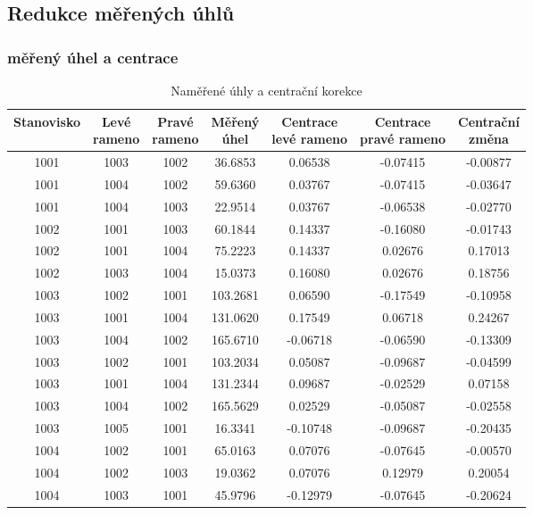 \subsection{Redukce měřených úhlů}
\subsubsection{měřený úhel a centrace}
\begin{table}[H]
    \centering
    \caption{Naměřené úhly a centrační korekce}
    \begin{tabular}{|c|c|c||c|c|c|c|}
        \hline
        Stanovisko & \makecell{Levé\\rameno} & \makecell{Pravé\\rameno} & \makecell{Měřený\\úhel} & \makecell{Centrace\\levé rameno} & \makecell{Centrace\\pravé rameno} & \makecell{Centrační\\změna} \\
        \hline\hline
        1001 & 1003 & 1002 & 36.6853 & 0.06538 & -0.07415 & -0.00877 \\
        1001 & 1004 & 1002 & 59.6360 & 0.03767 & -0.07415 & -0.03647 \\
        1001 & 1004 & 1003 & 22.9514 & 0.03767 & -0.06538 & -0.02770 \\
        \hline
        1002 & 1001 & 1003 & 60.1844 & 0.14337 & -0.16080 & -0.01743 \\
        1002 & 1001 & 1004 & 75.2223 & 0.14337 & 0.02676 & 0.17013 \\
        1002 & 1003 & 1004 & 15.0373 & 0.16080 & 0.02676 & 0.18756 \\
        \hline
        1003 & 1002 & 1001 & 103.2681 & 0.06590 & -0.17549 & -0.10958 \\
        1003 & 1001 & 1004 & 131.0620 & 0.17549 & 0.06718 & 0.24267 \\
        1003 & 1004 & 1002 & 165.6710 & -0.06718 & -0.06590 & -0.13309 \\
        1003 & 1002 & 1001 & 103.2034 & 0.05087 & -0.09687 & -0.04599 \\
        1003 & 1001 & 1004 & 131.2344 & 0.09687 & -0.02529 & 0.07158 \\
        1003 & 1004 & 1002 & 165.5629 & 0.02529 & -0.05087 & -0.02558 \\
        1003 & 1005 & 1001 & 16.3341 & -0.10748 & -0.09687 & -0.20435 \\
        \hline
        1004 & 1002 & 1001 & 65.0163 & 0.07076 & -0.07645 & -0.00570 \\
        1004 & 1002 & 1003 & 19.0362 & 0.07076 & 0.12979 & 0.20054 \\
        1004 & 1003 & 1001 & 45.9796 & -0.12979 & -0.07645 & -0.20624 \\
        \hline
    \end{tabular}
\end{table}


